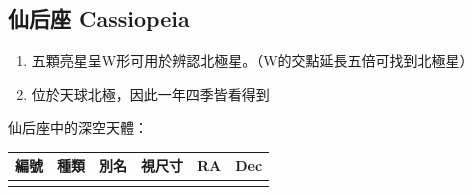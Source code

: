 \subsection{仙后座 Cassiopeia}
\begin{enumerate}
    \item 五顆亮星呈W形可用於辨認北極星。（W的交點延長五倍可找到北極星）
    \item 位於天球北極，因此一年四季皆看得到
\end{enumerate}
仙后座中的深空天體：
\newline

\begin{center}
\begin{longtable}{c | c | c | c | c | c}
    編號 & 種類 & 別名 & 視尺寸 & RA & Dec \\
    \hline
    \endfirsthead


    \endfoot

    \endlastfoot


\end{longtable}
\end{center}
